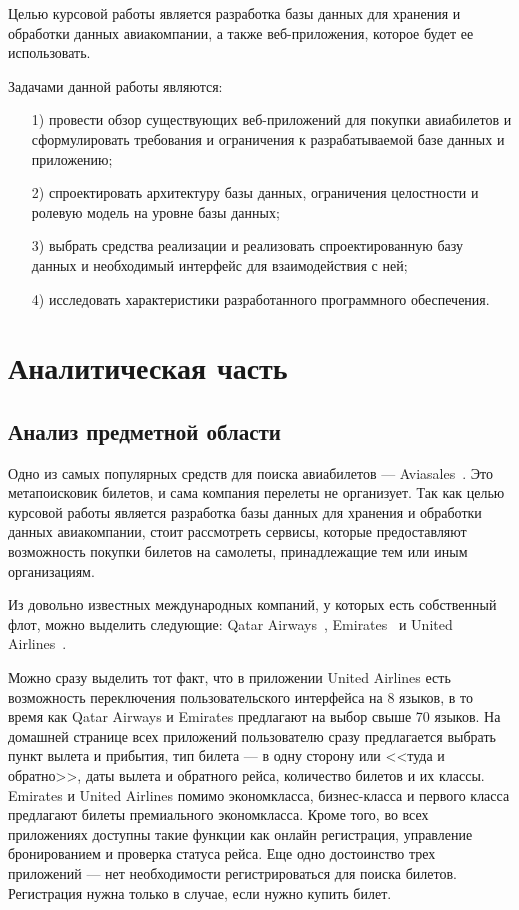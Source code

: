 \documentclass{bmstu}
\begin{document}
Целью курсовой работы является разработка базы данных для хранения и обработки данных авиакомпании, а также веб-приложения, которое будет ее использовать.

Задачами данной работы являются:
\begin{enumerate}
\item[1)] провести обзор существующих веб-приложений для покупки авиабилетов и сформулировать требования и ограничения к разрабатываемой базе данных и приложению;
\item[2)] спроектировать архитектуру базы данных, ограничения целостности и ролевую модель на уровне базы данных;
\item[3)] выбрать средства реализации и реализовать спроектированную базу данных и необходимый интерфейс для взаимодействия с ней;
\item[4)] исследовать характеристики разработанного программного обеспечения.
\end{enumerate}

\chapter{Аналитическая часть}

\section{Анализ предметной области}

Одно из самых популярных средств для поиска авиабилетов --- Aviasales~\cite{Aviasales}. 
Это метапоисковик билетов, и сама компания перелеты не организует. 
Так как целью курсовой работы является разработка базы данных для хранения и обработки данных авиакомпании, стоит рассмотреть сервисы, которые предоставляют возможность покупки билетов на самолеты, принадлежащие тем или иным организациям.

Из довольно известных международных компаний, у которых есть собственный флот, можно выделить следующие: Qatar Airways~\cite{QatarAirways}, Emirates~\cite{Emirates} и United Airlines~\cite{UnitedAirlines}. 

Можно сразу выделить тот факт, что в приложении United Airlines есть возможность переключения пользовательского интерфейса на 8 языков, в то время как Qatar Airways и Emirates предлагают на выбор свыше 70 языков. 
На домашней странице всех приложений пользователю сразу предлагается выбрать пункт вылета и прибытия, тип билета --- в одну сторону или <<туда и обратно>>, даты вылета и обратного рейса, количество билетов и их классы. 
Emirates и United Airlines помимо экономкласса, бизнес-класса и первого класса предлагают билеты премиального экономкласса. 
Кроме того, во всех приложениях доступны такие функции как онлайн регистрация, управление бронированием и проверка статуса рейса. 
Еще одно достоинство трех приложений --- нет необходимости регистрироваться для поиска билетов. 
Регистрация нужна только в случае, если нужно купить билет.
\end{document}
